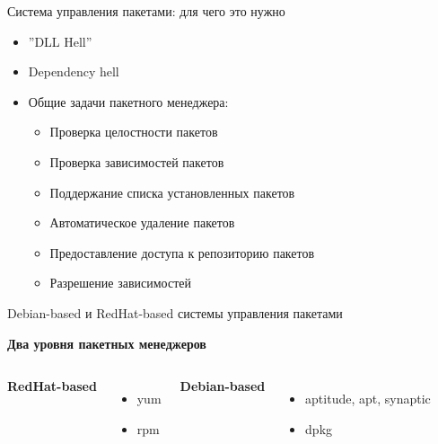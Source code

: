 \begin{frame}{Система управления пакетами: для чего это нужно}
\begin{itemize}
 \item ''DLL Hell''
 \item Dependency hell
 \item Общие задачи пакетного менеджера:
   \begin{itemize}
     \item Проверка целостности пакетов
     \item Проверка зависимостей пакетов
        \item Поддержание списка установленных пакетов
        \item Автоматическое удаление пакетов
     \item Предоставление доступа к репозиторию пакетов
     \item Разрешение зависимостей
   \end{itemize}
\end{itemize}
\end{frame}

\begin{frame}{Debian-based и RedHat-based системы управления пакетами}
\begin{center}
 \textbf{Два уровня пакетных менеджеров}
\end{center}
\begin{columns}
  \begin{center}
    \textbf{RedHat-based}
  \end{center}
  \begin{itemize}
    \item yum
    \item rpm
  \end{itemize}
  \begin{center}
    \textbf{Debian-based}
  \end{center}
  \begin{itemize}
    \item aptitude, apt, synaptic
    \item dpkg
  \end{itemize}
\end{columns}
\end{frame}

